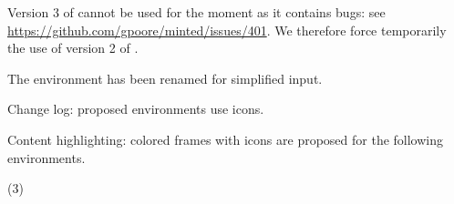\documentclass{tutodoc}
\begin{document}
\small

\begin{tdoctech}
    \item Version 3 of  cannot be used for the moment as it contains bugs: see \url{https://github.com/gpoore/minted/issues/401}. We therefore force temporarily the use of version 2 of .
\end{tdoctech}


\begin{tdocbreak}
    \item The  environment has been renamed  for simplified input.
\end{tdocbreak}


\begin{tdocnew}
    \item Change log: proposed environments use icons.


    \item Content highlighting: colored frames with icons are proposed for the following environments.
    \begin{tasks}[label=\arabic*.](3)
        \task {}
        \task {}
        \task {}
        \task {}
        \task {}
    \end{tasks}
\end{tdocnew}
\end{document}
